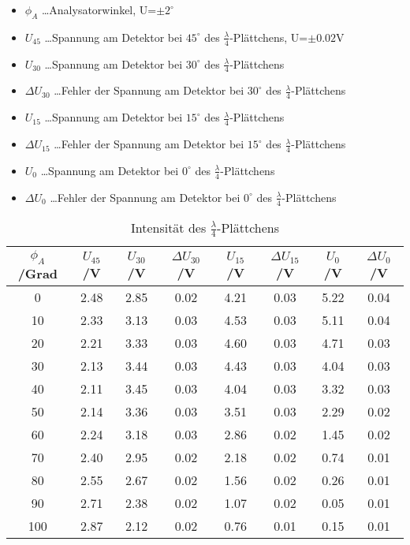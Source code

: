 \documentclass[a4paper]{article}
\begin{document}
\begin{table}[ht]
  \centering
  \caption{Intensität des $\frac{\lambda}{4}$-Plättchens}
  \begin{itemize}
    \item $\phi_A$ \dots Analysatorwinkel, U=$\pm 2^\circ$
    \item $U_{45}$ \dots Spannung am Detektor bei $45^\circ$ des $\frac{\lambda}{4}$-Plättchens, U=$\pm 0.02$V
    \item $U_{30}$ \dots Spannung am Detektor bei $30^\circ$ des $\frac{\lambda}{4}$-Plättchens
    \item $\Delta U_{30}$ \dots Fehler der Spannung am Detektor bei $30^\circ$ des $\frac{\lambda}{4}$-Plättchens
    \item $U_{15}$ \dots Spannung am Detektor bei $15^\circ$ des $\frac{\lambda}{4}$-Plättchens
    \item $\Delta U_{15}$ \dots Fehler der Spannung am Detektor bei $15^\circ$ des $\frac{\lambda}{4}$-Plättchens
    \item $U_{0}$ \dots Spannung am Detektor bei $0^\circ$ des $\frac{\lambda}{4}$-Plättchens
    \item $\Delta U_{0}$ \dots Fehler der Spannung am Detektor bei $0^\circ$ des $\frac{\lambda}{4}$-Plättchens
  \end{itemize}
  \begin{tabular}{|c|c|c|c|c|c|c|c|}
    \hline
    $\phi_A$/Grad&  $U_{45}$/V& $U_{30}$/V& $\Delta U_{30}$/V& $U_{15}$/V& $\Delta U_{15}$/V& $U_{0}$/V& $\Delta U_{0}$/V\\
    \hline
   0&2.48&2.85&0.02&4.21&0.03&5.22&0.04\\
    \hline
   10&2.33&3.13&0.03&4.53&0.03&5.11&0.04\\
    \hline
   20&2.21&3.33&0.03&4.60&0.03&4.71&0.03\\
    \hline
   30&2.13&3.44&0.03&4.43&0.03&4.04&0.03\\
    \hline
   40&2.11&3.45&0.03&4.04&0.03&3.32&0.03\\
    \hline
   50&2.14&3.36&0.03&3.51&0.03&2.29&0.02\\
    \hline
   60&2.24&3.18&0.03&2.86&0.02&1.45&0.02\\
    \hline
   70&2.40&2.95&0.02&2.18&0.02&0.74&0.01\\
    \hline
   80&2.55&2.67&0.02&1.56&0.02&0.26&0.01\\
    \hline
   90&2.71&2.38&0.02&1.07&0.02&0.05&0.01\\
    \hline
   100&2.87&2.12&0.02&0.76&0.01&0.15&0.01\\

\end{tabular}
\end{table}
\end{document}
